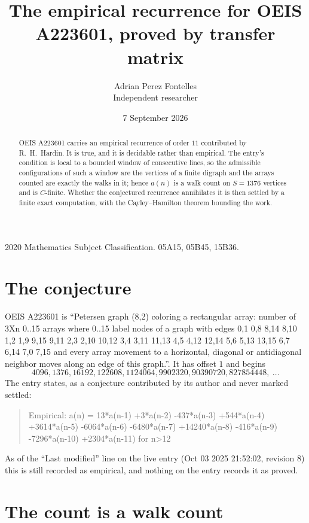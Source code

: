 \documentclass[11pt,a4paper]{article}
\title{The empirical recurrence for OEIS A223601, proved by transfer matrix}
\author{Adrian Perez Fontelles\\ \small Independent researcher}
\date{7 September 2026}
\theoremstyle{plain}
\theoremstyle{definition}
\begin{document}
\maketitle

\begin{abstract}
OEIS A223601 carries an empirical recurrence of order $11$ contributed by R.~H.~Hardin. It is
true, and it is decidable rather than empirical. The entry's condition is local to a bounded window of consecutive lines, so
the admissible configurations of such a window are the vertices of a finite digraph and the
arrays counted are exactly the walks in it; hence $a(n)$ is a walk count on $S=1376$ vertices
and is $C$-finite. Whether the conjectured recurrence annihilates it is then settled by a
finite exact computation, with the Cayley--Hamilton theorem bounding the work.
\end{abstract}

\noindent\small 2020 Mathematics Subject Classification. 05A15, 05B45, 15B36.\normalsize

\section{The conjecture}

OEIS A223601 is ``Petersen graph (8,2) coloring a rectangular array: number of 3Xn 0..15 arrays where 0..15 label nodes of a graph with edges 0,1 0,8 8,14 8,10 1,2 1,9 9,15 9,11 2,3 2,10 10,12 3,4 3,11 11,13 4,5 4,12 12,14 5,6 5,13 13,15 6,7 6,14 7,0 7,15 and every array movement to a horizontal, diagonal or antidiagonal neighbor moves along an edge of this graph.''. It has offset $1$ and begins
\[
4096, 1376, 16192, 122608, 1124064, 9902320, 90390720, 827854448,\ \dots
\]
The entry states, as a conjecture contributed by its author and never marked settled:
\begin{quote}
Empirical: a(n) = 13*a(n-1) +3*a(n-2) -437*a(n-3) +544*a(n-4) +3614*a(n-5) -6064*a(n-6) -6480*a(n-7) +14240*a(n-8) -416*a(n-9) -7296*a(n-10) +2304*a(n-11) for n>12
\end{quote}
As of the ``Last modified'' line on the live entry (Oct 03 2025 21:52:02, revision 8) this is still
recorded as empirical, and nothing on the entry records it as proved.

\section{The count is a walk count}
\end{document}

